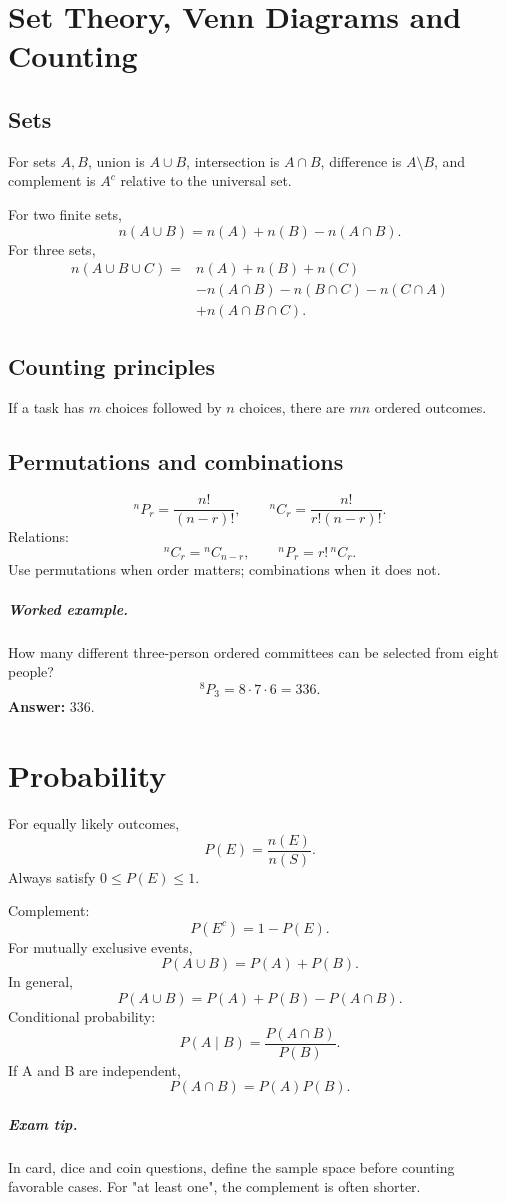 \documentclass[12pt,a4paper,oneside]{book}
\newcommand{\ans}[1]{\textbf{Answer:} #1}
\newcommand{\tip}[1]{\paragraph{Exam tip.} #1}
\newcommand{\q}[2]{\paragraph{#1} #2}
\begin{document}
\chapter[Sets, Venn Diagrams and Counting]{Set Theory, Venn Diagrams and Counting}
\section{Sets}
For sets \(A,B\), union is \(A\cup B\), intersection is \(A\cap B\), difference is \(A\setminus B\), and complement is \(A^c\) relative to the universal set.

For two finite sets,
\[n(A\cup B)=n(A)+n(B)-n(A\cap B).\]
For three sets,
\begin{align*}
n(A\cup B\cup C)={}&n(A)+n(B)+n(C)\\
&-n(A\cap B)-n(B\cap C)-n(C\cap A)\\
&+n(A\cap B\cap C).
\end{align*}

\section{Counting principles}
If a task has \(m\) choices followed by \(n\) choices, there are \(mn\) ordered outcomes.

\section{Permutations and combinations}
\[{}^nP_r=\frac{n!}{(n-r)!},\qquad {}^nC_r=\frac{n!}{r!(n-r)!}.\]
Relations:
\[{}^nC_r={}^nC_{n-r},\qquad {}^nP_r=r!\,{}^nC_r.\]
Use permutations when order matters; combinations when it does not.

\q{Worked example.}{How many different three-person ordered committees can be selected from eight people?}
\[{}^8P_3=8\cdot7\cdot6=336.\]
\ans{336.}

\chapter[Probability]{Probability}
For equally likely outcomes,
\[P(E)=\frac{n(E)}{n(S)}.\]
Always satisfy \(0\le P(E)\le1\).

Complement:
\[P(E^c)=1-P(E).\]
For mutually exclusive events,
\[P(A\cup B)=P(A)+P(B).\]
In general,
\[P(A\cup B)=P(A)+P(B)-P(A\cap B).\]
Conditional probability:
\[P(A\mid B)=\frac{P(A\cap B)}{P(B)}.\]
If A and B are independent,
\[P(A\cap B)=P(A)P(B).\]

\tip{In card, dice and coin questions, define the sample space before counting favorable cases. For "at least one", the complement is often shorter.}
\end{document}
